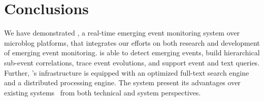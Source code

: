 
\section{Conclusions}
We have demonstrated \ring, a real-time emerging event monitoring system over microblog platforms, 
that integrates our efforts on both research and development of emerging event monitoring.
\ring is able to detect emerging events, build hierarchical sub-event correlations, trace event evolutions, and support event and text queries.
Further, \ring's infrastructure is equipped with an optimized full-text search engine and a distributed processing engine.
The system present its advantages over existing systems~\cite{mathioudakis2010twittermonitor,xie2014clear, schubert2014signitrend} from both technical and system perspectives.








\balance
